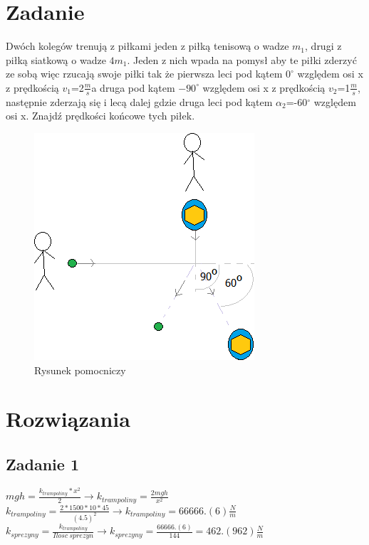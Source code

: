 \documentclass[14pt]{extarticle}
\begin{document}
    \section{Zadanie}
    \begin{flushleft}
        Dwóch kolegów trenują z piłkami jeden z piłką tenisową o wadze $m_1$, drugi z piłką siatkową o wadze $4m_1$. Jeden z nich wpada na pomysł aby te piłki zderzyć ze sobą więc rzucają swoje piłki tak że
        pierwsza leci pod kątem $0^\circ$ względem osi x z prędkością $v_1$=2$\frac{m}{s}$a druga pod kątem $-90^\circ$ względem osi x z prędkością $v_2$=1$\frac{m}{s}$,
        następnie zderzają się i lecą dalej gdzie druga leci pod kątem $\alpha _2$=-60$^\circ$ względem osi x.
        Znajdź prędkości końcowe tych piłek.
    \end{flushleft}
    \begin{figure}[H]
        \centering
        \includegraphics{pilki3p}
        \caption{Rysunek pomocniczy}
    \end{figure}
    \clearpage
    \section{Rozwiązania}
    \subsection{Zadanie 1}
    \Large
        $mgh=\frac{k_{trampoliny} \ast x^2}{2} \rightarrow k_{trampoliny}=\frac{2mgh}{x^2}$\\
        \(k_{trampoliny}=\frac{2\ast 1500 \ast 10\ast 45}{(4.5)^2} \rightarrow k_{trampoliny}=66666.(6)\frac{N}{m}\)\\
        \(k_{sprezyny}=\frac{k_{trampoliny}}{Ilosc \ sprezyn} \rightarrow k_{sprezyny}=\frac{66666.(6)}{144} = 462.(962)\frac{N}{m}\)
\end{document}
